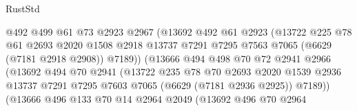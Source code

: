 \begin{lexlean}{RustStd}
\begin{coremodule}
                                @492
                                @499
                                @61
                                @73
                                @2923
                                @2967
                                (@13692
                                  @492
                                  @61
                                  @2923
                                  (@13722
                                    @225
                                    @78
                                    @61
                                    @2693
                                    @2020
                                    @1508
                                    @2918
                                    @13737
                                    @7291
                                    @7295
                                    @7563
                                    @7065
                                    (@6629 (@7181 @2918 @2908))
                                    @7189))
                                (@13666
                                  @494
                                  @498
                                  @70
                                  @72
                                  @2941
                                  @2966
                                  (@13692
                                    @494
                                    @70
                                    @2941
                                    (@13722
                                      @235
                                      @78
                                      @70
                                      @2693
                                      @2020
                                      @1539
                                      @2936
                                      @13737
                                      @7291
                                      @7295
                                      @7603
                                      @7065
                                      (@6629 (@7181 @2936 @2925))
                                      @7189))
                                  (@13666
                                    @496
                                    @133
                                    @70
                                    @14
                                    @2964
                                    @2049
                                    (@13692
                                      @496
                                      @70
                                      @2964

\end{coremodule}
\end{lexlean}
